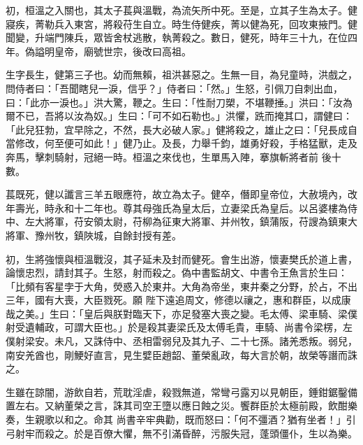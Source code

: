 \begin{pinyinscope}
 初，桓溫之入關也，其太子萇與溫戰，為流矢所中死。至是，立其子生為太子。健寢疾，菁勒兵入東宮，將殺苻生自立。時生侍健疾，菁以健為死，回攻東掖門。健聞變，升端門陳兵，眾皆舍杖逃散，執菁殺之。數日，健死，時年三十九，在位四年。偽謚明皇帝，廟號世宗，後改曰高祖。



 生字長生，健第三子也。幼而無賴，祖洪甚惡之。生無一目，為兒童時，洪戲之，問侍者曰：「吾聞瞎兒一淚，信乎？」侍者曰：「然。」生怒，引佩刀自刺出血，曰：「此亦一淚也。」洪大驚，鞭之。生曰：「性耐刀槊，不堪鞭捶。」洪曰：「汝為爾不已，吾將以汝為奴。」生曰：「可不如石勒也。」洪懼，跣而掩其口，謂健曰：「此兒狂勃，宜早除之，不然，長大必破人家。」健將殺之，雄止之曰：「兒長成自當修改，何至便可如此！」健乃止。及長，力舉千鈞，雄勇好殺，手格猛獸，走及奔馬，擊刺騎射，冠絕一時。桓溫之來伐也，生單馬入陣，搴旗斬將者前
 後十數。



 萇既死，健以讖言三羊五眼應符，故立為太子。健卒，僭即皇帝位，大赦境內，改年壽光，時永和十二年也。尊其母強氏為皇太后，立妻梁氏為皇后。以呂婆樓為侍中、左大將軍，苻安領太尉，苻柳為征東大將軍、并州牧，鎮蒲阪，苻謏為鎮東大將軍、豫州牧，鎮陜城，自餘封授有差。



 初，生將強懷與桓溫戰沒，其子延未及封而健死。會生出游，懷妻樊氏於道上書，論懷忠烈，請封其子。生怒，射而殺之。偽中書監胡文、中書令王魚言於生曰：「比頻有客星孛于大角，熒惑入於東井。大角為帝坐，東井秦之分野，於占，不出三年，國有大喪，大臣戮死。願
 陛下遠追周文，修德以禳之，惠和群臣，以成康哉之美。」生曰：「皇后與朕對臨天下，亦足發塞大喪之變。毛太傅、梁車騎、梁僕射受遺輔政，可謂大臣也。」於是殺其妻梁氏及太傅毛貴，車騎、尚書令梁楞，左僕射梁安。未凡，又誅侍中、丞相雷弱兒及其九子、二十七孫。諸羌悉叛。弱兒，南安羌酋也，剛鯁好直言，見生嬖臣趙韶、董榮亂政，每大言於朝，故榮等譖而誅之。



 生雖在諒闇，游飲自若，荒耽淫虐，殺戮無道，常彎弓露刃以見朝臣，錘鉗鋸鑿備置左右。又納董榮之言，誅其司空王墮以應日蝕之災。饗群臣於太極前殿，飲酣樂奏，生親歌以和之。命其
 尚書辛牢典勸，既而怒曰：「何不彊酒？猶有坐者！」引弓射牢而殺之。於是百僚大懼，無不引滿昏醉，污服失冠，蓬頭僵仆，生以為樂。




\end{pinyinscope}
